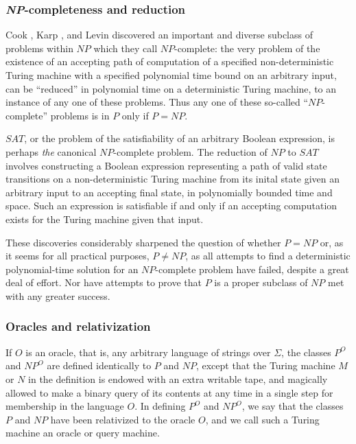 \documentclass[letterpaper]{article}
\begin{document}
\subsubsection{\textit{NP}-completeness and reduction}
Cook \cite{cook1971complexity}, Karp \cite{karp1972reducibility}, and Levin \cite{levin1973universal} discovered an important and diverse subclass of problems within $NP$ which they call $NP$-complete:  the very problem of the existence of an accepting path of computation of a specified non-deterministic Turing machine with a specified polynomial time bound on an arbitrary input, can be ``reduced'' in polynomial time on a deterministic Turing machine, to an instance of any one of these problems.  Thus any one of these so-called ``$NP$-complete'' problems is in $P$ only if $P=NP$.

$SAT$, or the problem of the satisfiability of an arbitrary Boolean expression, is perhaps \textit{the} canonical $NP$-complete problem.  The reduction of $NP$ to $SAT$ involves constructing a Boolean expression representing a path of valid state transitions on a non-deterministic Turing machine from its inital state given an arbitrary input to an accepting final state, in polynomially bounded time and space.  Such an expression is satisfiable if and only if an accepting computation exists for the Turing machine given that input.

These discoveries considerably sharpened the question of whether $P=NP$ or, as it seems for all practical purposes, $P\ne NP$, as all attempts to find a deterministic polynomial-time solution for an $NP$-complete problem have failed, despite a great deal of effort.  Nor have attempts to prove that $P$ is a proper subclass of $NP$ met with any greater success.

\subsubsection{Oracles and relativization}\label{o-r}
\begin{definition}
If $O$ is an oracle, that is, any arbitrary language of strings over $\Sigma$, the classes $P^O$ and $NP^O$ are defined identically to $P$ and $NP$, except that the Turing machine $M$ or $N$ in the definition is endowed with an extra writable tape, and magically allowed to make a binary query of its contents at any time in a single step for membership in the language $O$.  In defining $P^O$ and $NP^O$, we say that the classes $P$ and $NP$ have been relativized to the oracle $O$, and we call such a Turing machine an oracle or query machine.
\end{definition}
\end{document}
